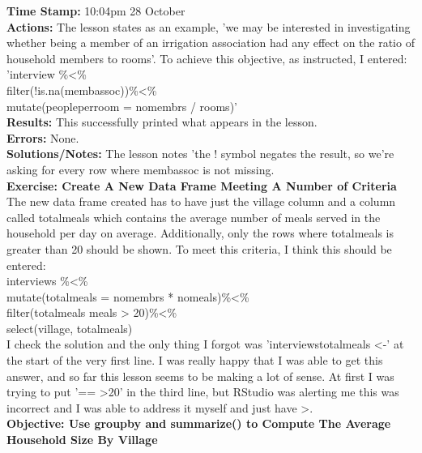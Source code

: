 \documentclass{article}
\begin{document}
\begin{FlushLeft}
\textbf{Time Stamp:} 10:04pm 28 October\\
\textbf{Actions:} The lesson states as an example, 'we may be interested in investigating whether being a member of an irrigation association had any effect on the ratio of household members to rooms'. To achieve this objective, as instructed, I entered:\\
'interview \%\textless\%\\
filter(!is.na(memb\textunderscore assoc))\%\textless\%\\
mutate(people\textunderscore per\textunderscore room = no\textunderscore membrs / rooms)'\\
\textbf{Results:} This successfully printed what appears in the lesson. \\
\textbf{Errors:} None.\\
\textbf{Solutions/Notes:} The lesson notes 'the ! symbol negates the result, so we’re asking for every row where memb\textunderscore assoc is not missing.\\
\vspace{5mm}
\textbf{Exercise: Create A New Data Frame Meeting A Number of Criteria}\\ 
The new data frame created has to have just the village column and a column called total\textunderscore meals which contains the average number of meals served in the household per day on average. Additionally, only the rows where total\textunderscore meals is greater than 20 should be shown. To meet this criteria, I think this should be entered:\\
interviews \%\textless\%\\
mutate(total\textunderscore meals = no\textunderscore membrs * no\textunderscore meals)\%\textless\%\\
filter(total\textunderscore meals meals \textgreater{} 20)\%\textless\%\\
select(village, total\textunderscore meals)\\
I check the solution and the only thing I forgot was 'interviews\textunderscore total\textunderscore meals \textless -' at the start of the very first line. I was really happy that I was able to get this answer, and so far this lesson seems to be making a lot of sense. At first I was trying to put '== \textgreater 20' in the third line, but RStudio was alerting me this was incorrect and I was able to address it myself and just have \textgreater.\\
\vspace{5mm}
\textbf{Objective: Use group\textunderscore by and summarize() to Compute The Average Household Size By Village}\\ 

\end{FlushLeft}
\end{document}

